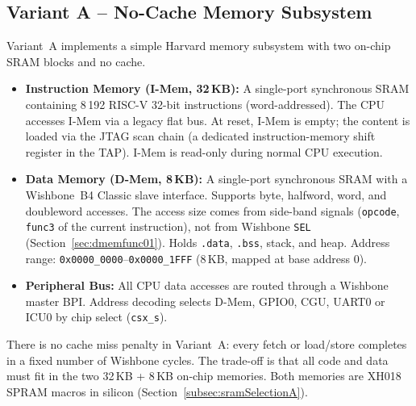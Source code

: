 \subsection{Variant A -- No-Cache Memory Subsystem}
\label{subsec:noCacheVariant}

Variant~A implements a simple Harvard memory subsystem with two on-chip SRAM
blocks and no cache.

\begin{itemize}
  \item \textbf{Instruction Memory (I-Mem, 32\,KB):}
    A single-port synchronous SRAM containing 8\,192 RISC-V 32-bit
    instructions (word-addressed).
    The CPU accesses I-Mem via a legacy flat bus.
    At reset, I-Mem is empty; the content is loaded via the JTAG scan chain
    (a dedicated instruction-memory shift register in the TAP).
    I-Mem is read-only during normal CPU execution.

  \item \textbf{Data Memory (D-Mem, 8\,KB):}
    A single-port synchronous SRAM with a Wishbone~B4 Classic slave interface.
    Supports byte, halfword, word, and doubleword accesses. The access size
    comes from side-band signals (\texttt{opcode}, \texttt{func3} of the
    current instruction), not from Wishbone \texttt{SEL}
    (Section~\ref{sec:dmemfunc01}).
    Holds \texttt{.data}, \texttt{.bss}, stack, and heap.
    Address range: \texttt{0x0000\_0000}--\texttt{0x0000\_1FFF}
    (8\,KB, mapped at base address 0).

  \item \textbf{Peripheral Bus:}
    All CPU data accesses are routed through a Wishbone master BPI.
    Address decoding selects D-Mem, GPIO0, CGU, UART0 or ICU0 by chip
    select (\texttt{csx\_s}).
\end{itemize}

There is no cache miss penalty in Variant~A: every fetch or load/store
completes in a fixed number of Wishbone cycles.
The trade-off is that all code and data must fit in the two 32\,KB + 8\,KB
on-chip memories. Both memories are XH018 SPRAM macros in silicon
(Section~\ref{subsec:sramSelectionA}).

